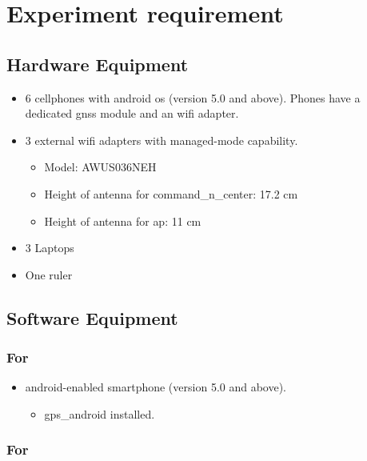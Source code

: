 \section{Experiment requirement}\label{experiment-requirement}

\subsection{Hardware Equipment}\label{hardware-equipment}

\begin{itemize}
\tightlist
\item
  6 cellphones with \gls{android} \acrshort{os} (version 5.0 and above). Phones have a dedicated \gls{gnss} module and an \gls{wifi} adapter.
\item
  3 external \gls{wifi} adapters with managed-mode capability.

  \begin{itemize}
  \tightlist
  \item
    Model: AWUS036NEH
  \item
    Height of antenna  for \gls{command_n_center}: 17.2 cm
  \item
    Height of antenna  for \acrshort{ap}: 11 cm
  \end{itemize}
\item
  3 Laptops
\item
  One ruler
\end{itemize}

\subsection{Software Equipment}\label{software-equipment}

\subsubsection{For  }

\begin{itemize}
\tightlist
\item
  \gls{android}-enabled smartphone (version 5.0 and above).

  \begin{itemize}
  \tightlist
  \item
  	\Gls{gps_android} installed.
    \end{itemize}
\end{itemize}

\subsubsection{For  }\label{for-command-center-cnc}

